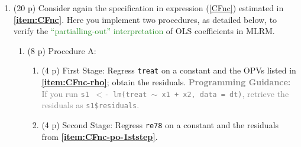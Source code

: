 \documentclass[
]{article}
\newenvironment{Shaded}{\begin{snugshade}}{\end{snugshade}}
\newcommand{\AttributeTok}[1]{\textcolor[rgb]{0.13,0.29,0.53}{#1}}
\newcommand{\CommentTok}[1]{\textcolor[rgb]{0.56,0.35,0.01}{\textit{#1}}}
\newcommand{\DecValTok}[1]{\textcolor[rgb]{0.00,0.00,0.81}{#1}}
\newcommand{\FunctionTok}[1]{\textcolor[rgb]{0.13,0.29,0.53}{\textbf{#1}}}
\newcommand{\NormalTok}[1]{#1}
\newcommand{\OtherTok}[1]{\textcolor[rgb]{0.56,0.35,0.01}{#1}}
\newcommand{\SpecialCharTok}[1]{\textcolor[rgb]{0.81,0.36,0.00}{\textbf{#1}}}
\providecommand{\tightlist}{%
  \setlength{\itemsep}{0pt}\setlength{\parskip}{0pt}}
\begin{document}
\begin{enumerate}
\def\labelenumi{\arabic{enumi}.}
\setcounter{enumi}{5}
\item
  (20 p) Consider again the specification in expression (\ref{CFnc})
  estimated in \textbf{\textbf{\ref{item:CFnc}}}. Here you implement two
  procedures, as detailed below, to verify the
  \textcolor{ForestGreen}{``partialling-out'' interpretation} of OLS
  coefficients in MLRM.\label{item:CFnc-po}

  \begin{enumerate}
  \def\labelenumii{\alph{enumii}.}
  \tightlist
  \item
    (8 p) Procedure A:

    \begin{enumerate}
    \def\labelenumiii{\roman{enumiii}.}
    \item
      (4 p) First Stage: Regress \texttt{treat} on a constant and the
      OPVs listed in \textbf{\ref{item:CFnc-rho}}; obtain the residuals.
      \textcolor{gray}{\textbf{Programming Guidance:} If you run \texttt{s1 $<$- lm(treat $\sim$ x1 + x2, data = dt)}, retrieve the residuals as \texttt{s1\$residuals}.}\label{item:CFnc-po-1ststep}

\begin{Shaded}
\end{Shaded}
    \item
      (4 p) Second Stage: Regress \texttt{re78} on a constant and the
      residuals from
      \textbf{\ref{item:CFnc-po-1ststep}}.\label{item:CFnc-po-2ndstep}


\end{enumerate}
\end{enumerate}
\end{enumerate}
\end{document}
